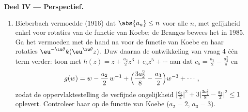 \begin{problem}
\medskip
\noindent\textbf{Deel IV --- Perspectief.}
\begin{enumerate}[resume]
  \item Bieberbach vermoedde (1916) dat $\abs{a_n} \leq n$ voor
        alle $n$, met gelijkheid enkel voor rotaties van de
        functie van Koebe; de Branges bewees het in 1985. Ga het
        vermoeden met de hand na voor de functie van Koebe en
        haar rotaties $\eu^{-\iu\theta}k(\eu^{\iu\theta}z)$. Duw
        daarna de ontwikkeling van vraag 4 één term verder: toon
        met $h(z) = z + \frac{a_2}2z^3 + c_5z^5 + \cdots$ aan dat
        $c_5 = \frac{a_3}2 - \frac{a_2^2}8$ en
        \[
        g(w) = w - \frac{a_2}{2}\,w^{-1} +
        \Bigl(\frac{3a_2^2}8 - \frac{a_3}2\Bigr)w^{-3} +
        \cdots ,
        \]
        zodat de oppervlaktestelling de verfijnde ongelijkheid
        $\bigl|\frac{a_2}2\bigr|^2 + 3\bigl|\frac{3a_2^2}8 -
        \frac{a_3}2\bigr|^2 \leq 1$ oplevert. Controleer haar op
        de functie van Koebe ($a_2 = 2$, $a_3 = 3$).
\end{enumerate}


\end{problem}
